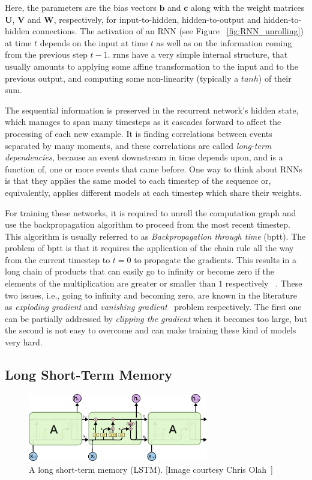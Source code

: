 Here, the parameters are the bias vectors $ \textbf{b} $ and $ \textbf{c} $ along with the weight matrices $\textbf{U}$, $\textbf{V}$ and $\textbf{W}$, respectively, for input-to-hidden, hidden-to-output and hidden-to-hidden connections. The activation of an RNN (see Figure ~\ref{fig:RNN_unrolling}) at time $t$ depends on the input at time $t$ as well as on the information coming from the previous step $t-1$. \gls{rnn}s have a very simple internal structure, that usually amounts to applying some affine transformation to the input and to the previous output, and computing some non-linearity (typically a $tanh$) of their sum.

The sequential information is preserved in the recurrent network's hidden state, which manages to span many timesteps as it cascades forward to affect the processing of each new example. It is finding correlations between events separated by many moments, and these correlations are called \textit{long-term dependencies}, because an event downstream in time depends upon, and is a function of, one or more events that came before. One way to think about RNNs is that they applies the same model to each timestep of the sequence or, equivalently, applies different models at each timestep which share their weights. 

For training these networks, it is required to unroll the computation graph and use the backpropagation algorithm to proceed from the most recent timestep. This algorithm is usually referred to as \emph{Backpropagation through time} (\gls{bptt}). The problem of \gls{bptt} is that it requires the application of the chain rule all the way from the current timestep to $t = 0$ to propagate the gradients.  This results in a long chain of products that can easily go to infinity or become zero if the elements of the multiplication are greater or smaller than $1$ respectively ~\cite{Bengio_94}. These two issues, i.e., going to infinity and becoming zero, are known in the literature as \emph{exploding gradient} and \emph{vanishing gradient}~\cite{Hochreiter_01} problem respectively. The first one can be partially addressed by \emph{clipping the gradient} when it becomes too large, but the second is not easy to overcome and can make training these kind of models very hard.


\subsection{Long Short-Term Memory}
\begin{figure}[t]
	\centering
	\includegraphics[width=0.7\textwidth]{figures/LSTM.pdf}
	\caption[A long short-term memory (LSTM)]
	{A long short-term memory (LSTM). [Image courtesy Chris Olah~\cite{colah_15}]\label{fig:LSTM}}
\end{figure}

